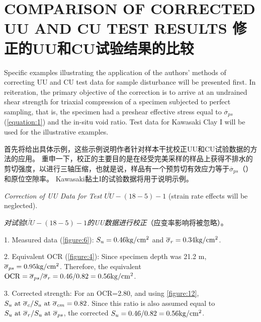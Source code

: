 \section{COMPARISON OF CORRECTED UU AND CU TEST RESULTS 修正的UU和CU试验结果的比较}


\begin{paracol}{2}
    
    Specific examples illustrating the application of the authors' methods of correcting UU and CU test data for sample disturbance will be presented first. In reiteration, the primary objective of the correction is to arrive at an undrained shear strength for triaxial compression of a specimen subjected to perfect sampling, that is, the specimen had a preshear effective stress equal to $\overline{\sigma}_{ps}$ (\autoref{equation:1}) and the in-situ void ratio. Test data for Kawasaki Clay I will be used for the illustrative examples.

    \switchcolumn

    首先将给出具体示例，这些示例说明作者针对样本干扰校正UU和CU试验数据的方法的应用。 重申一下，校正的主要目的是在经受完美采样的样品上获得不排水的剪切强度，以进行三轴压缩，也就是说，样品有一个预剪切有效应力等于$\overline{\sigma}_{ps}$（）和原位空隙率。 Kawasaki黏土I的试验数据将用于说明示例。

    \switchcolumn*

    \emph{Correction of UU Data for Test $\overline{UU}-(18-5)-1$} (strain rate effects will be neglected).

    \switchcolumn

    \emph{对试验$\overline{UU}-(18-5)-1$的UU数据进行校正}（应变率影响将被忽略）。
  
    \switchcolumn*

    1. Measured data (\autoref{figure:6}): $S_u=0.46{\rm kg/cm^2}$ and $\overline{\sigma}_r=0.34{\rm kg/cm^2}$.

    2. Equivalent OCR (\autoref{figure:4}): Since specimen depth was 21.2 m, $\overline{\sigma}_{ps}=0.95{\rm kg/cm^2}$. Therefore, the equivalent ${\rm OCR}=\overline{\sigma}_{ps}/\overline{\sigma}_r=0.46/0.82=0.56{\rm kg/cm^2}$.

    3. Corrected strength: For an OCR=2.80, and using \autoref{figure:12}, $S_u~{\rm at}~\overline{\sigma}_c/S_u~{\rm at}~\overline{\sigma}_{cm}=0.82$. Since this ratio is also assumed equal to $S_u~{\rm at}~\overline{\sigma}_r/S_u~{\rm at}~\overline{\sigma}_{ps}$, the corrected $S_u=0.46/0.82=0.56{\rm kg/cm^2}$.


\end{paracol}
